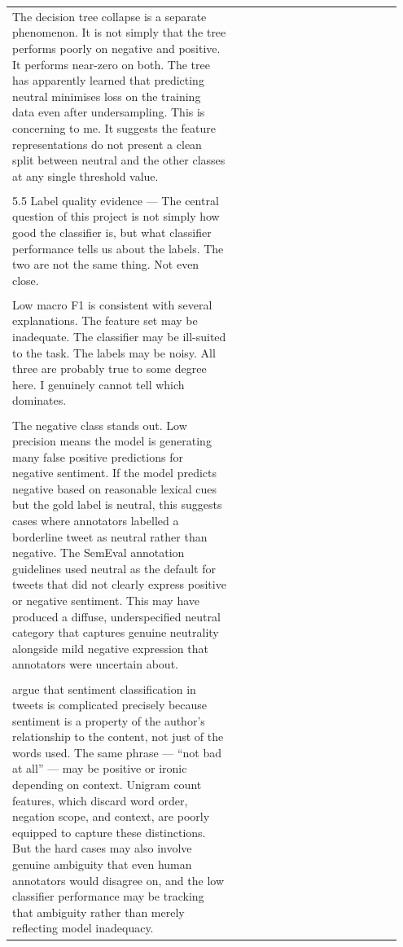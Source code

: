 \documentclass[11pt]{article}
\begin{document}
\begin{longtable}{|p{0.55\linewidth}|p{0.40\linewidth}|}
\hline
\rule{0pt}{3.5cm} & \\
\hline
The decision tree collapse is a separate phenomenon. It is not simply that the tree performs poorly on negative and positive. It performs near-zero on both. The tree has apparently learned that predicting neutral minimises loss on the training data even after undersampling. This is concerning to me. It suggests the feature representations do not present a clean split between neutral and the other classes at any single threshold value. & \\[2pt]
\hline
\rule{0pt}{3.5cm} & \\
\hline
5.5 Label quality evidence --- The central question of this project is not simply how good the classifier is, but what classifier performance tells us about the labels. The two are not the same thing. Not even close. & \\[2pt]
\hline
\rule{0pt}{3.5cm} & \\
\hline
Low macro F1 is consistent with several explanations. The feature set may be inadequate. The classifier may be ill-suited to the task. The labels may be noisy. All three are probably true to some degree here. I genuinely cannot tell which dominates. & \\[2pt]
\hline
\rule{0pt}{3.5cm} & \\
\hline
The negative class stands out. Low precision means the model is generating many false positive predictions for negative sentiment. If the model predicts negative based on reasonable lexical cues but the gold label is neutral, this suggests cases where annotators labelled a borderline tweet as neutral rather than negative. The SemEval annotation guidelines used neutral as the default for tweets that did not clearly express positive or negative sentiment. This may have produced a diffuse, underspecified neutral category that captures genuine neutrality alongside mild negative expression that annotators were uncertain about. & \\[2pt]
\hline
\rule{0pt}{3.5cm} & \\
\hline
argue that sentiment classification in tweets is complicated precisely because sentiment is a property of the author's relationship to the content, not just of the words used. The same phrase --- ``not bad at all'' --- may be positive or ironic depending on context. Unigram count features, which discard word order, negation scope, and context, are poorly equipped to capture these distinctions. But the hard cases may also involve genuine ambiguity that even human annotators would disagree on, and the low classifier performance may be tracking that ambiguity rather than merely reflecting model inadequacy. & \\[2pt]

\end{longtable}
\end{document}
